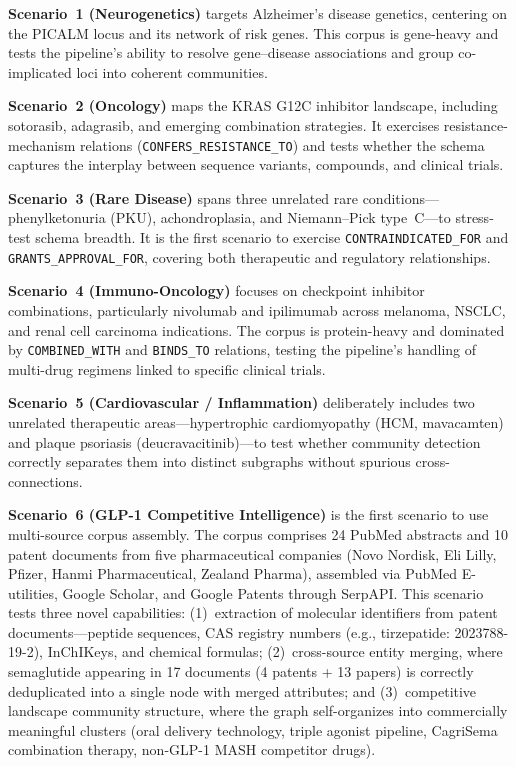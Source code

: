 \textbf{Scenario~1 (Neurogenetics)} targets Alzheimer's disease genetics, centering on the PICALM locus and its network of risk genes.
This corpus is gene-heavy and tests the pipeline's ability to resolve gene--disease associations and group co-implicated loci into coherent communities.

\textbf{Scenario~2 (Oncology)} maps the KRAS G12C inhibitor landscape, including sotorasib, adagrasib, and emerging combination strategies.
It exercises resistance-mechanism relations (\texttt{CONFERS\_RESISTANCE\_TO}) and tests whether the schema captures the interplay between sequence variants, compounds, and clinical trials.

\textbf{Scenario~3 (Rare Disease)} spans three unrelated rare conditions---phenylketonuria (PKU), achondroplasia, and Niemann--Pick type~C---to stress-test schema breadth.
It is the first scenario to exercise \texttt{CONTRAINDICATED\_FOR} and \texttt{GRANTS\_APPROVAL\_FOR}, covering both therapeutic and regulatory relationships.

\textbf{Scenario~4 (Immuno-Oncology)} focuses on checkpoint inhibitor combinations, particularly nivolumab and ipilimumab across melanoma, NSCLC, and renal cell carcinoma indications.
The corpus is protein-heavy and dominated by \texttt{COMBINED\_WITH} and \texttt{BINDS\_TO} relations, testing the pipeline's handling of multi-drug regimens linked to specific clinical trials.

\textbf{Scenario~5 (Cardiovascular / Inflammation)} deliberately includes two unrelated therapeutic areas---hypertrophic cardiomyopathy (HCM, mavacamten) and plaque psoriasis (deucravacitinib)---to test whether community detection correctly separates them into distinct subgraphs without spurious cross-connections.

\textbf{Scenario~6 (GLP-1 Competitive Intelligence)} is the first scenario to use multi-source corpus assembly. The corpus comprises 24 PubMed abstracts and 10 patent documents from five pharmaceutical companies (Novo Nordisk, Eli Lilly, Pfizer, Hanmi Pharmaceutical, Zealand Pharma), assembled via PubMed E-utilities, Google Scholar, and Google Patents through SerpAPI. This scenario tests three novel capabilities: (1)~extraction of molecular identifiers from patent documents---peptide sequences, CAS registry numbers (e.g., tirzepatide: 2023788-19-2), InChIKeys, and chemical formulas; (2)~cross-source entity merging, where semaglutide appearing in 17 documents (4 patents + 13 papers) is correctly deduplicated into a single node with merged attributes; and (3)~competitive landscape community structure, where the graph self-organizes into commercially meaningful clusters (oral delivery technology, triple agonist pipeline, CagriSema combination therapy, non-GLP-1 MASH competitor drugs).

